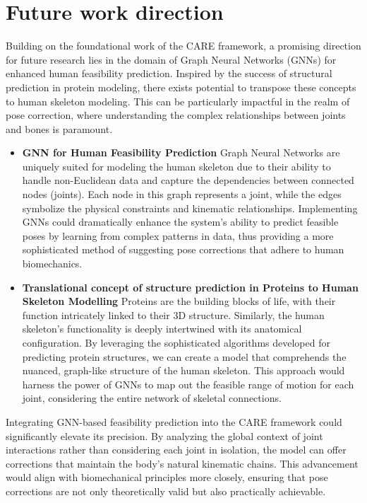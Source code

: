 \section{Future work direction}
Building on the foundational work of the CARE framework, a promising direction for future research lies in the domain of Graph Neural Networks (GNNs) for enhanced human feasibility prediction. Inspired by the success of structural prediction in protein modeling, there exists potential to transpose these concepts to human skeleton modeling. This can be particularly impactful in the realm of pose correction, where understanding the complex relationships between joints and bones is paramount.
\begin{itemize}
    \item \textbf{GNN for Human Feasibility Prediction} \newline
    Graph Neural Networks are uniquely suited for modeling the human skeleton due to their ability to handle non-Euclidean data and capture the dependencies between connected nodes (joints). Each node in this graph represents a joint, while the edges symbolize the physical constraints and kinematic relationships. Implementing GNNs could dramatically enhance the system's ability to predict feasible poses by learning from complex patterns in data, thus providing a more sophisticated method of suggesting pose corrections that adhere to human biomechanics.
    \item \textbf{Translational concept of structure prediction in Proteins to Human Skeleton Modelling} \newline
    Proteins are the building blocks of life, with their function intricately linked to their 3D structure. Similarly, the human skeleton's functionality is deeply intertwined with its anatomical configuration. By leveraging the sophisticated algorithms developed for predicting protein structures, we can create a model that comprehends the nuanced, graph-like structure of the human skeleton. This approach would harness the power of GNNs to map out the feasible range of motion for each joint, considering the entire network of skeletal connections.
\end{itemize}
Integrating GNN-based feasibility prediction into the CARE framework could significantly elevate its precision. By analyzing the global context of joint interactions rather than considering each joint in isolation, the model can offer corrections that maintain the body's natural kinematic chains. This advancement would align with biomechanical principles more closely, ensuring that pose corrections are not only theoretically valid but also practically achievable.
